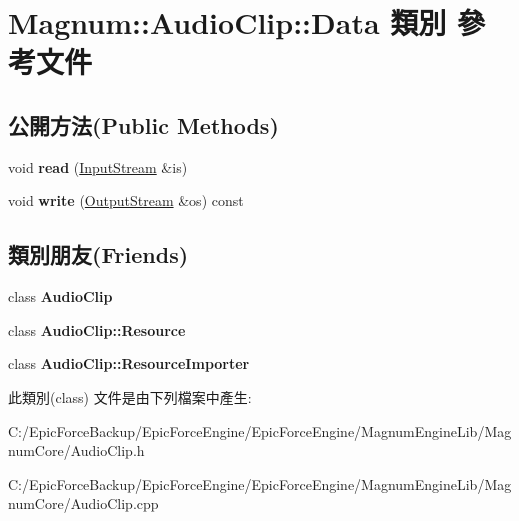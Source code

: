 \hypertarget{class_magnum_1_1_audio_clip_1_1_data}{}\section{Magnum\+:\+:Audio\+Clip\+:\+:Data 類別 參考文件}
\label{class_magnum_1_1_audio_clip_1_1_data}
\subsection*{公開方法(Public Methods)}
\begin{DoxyCompactItemize}
\item 
void {\bfseries read} (\hyperlink{class_magnum_1_1_input_stream}{Input\+Stream} \&is)\hypertarget{class_magnum_1_1_audio_clip_1_1_data_a3550977f63c32b69ca8e9fcb969626fd}{}\label{class_magnum_1_1_audio_clip_1_1_data_a3550977f63c32b69ca8e9fcb969626fd}

\item 
void {\bfseries write} (\hyperlink{class_magnum_1_1_output_stream}{Output\+Stream} \&os) const \hypertarget{class_magnum_1_1_audio_clip_1_1_data_a8439eebdc236289cc3fc9e5635b1609f}{}\label{class_magnum_1_1_audio_clip_1_1_data_a8439eebdc236289cc3fc9e5635b1609f}

\end{DoxyCompactItemize}
\subsection*{類別朋友(Friends)}
\begin{DoxyCompactItemize}
\item 
class {\bfseries Audio\+Clip}\hypertarget{class_magnum_1_1_audio_clip_1_1_data_a9d56e3679258061c40e71e5321153525}{}\label{class_magnum_1_1_audio_clip_1_1_data_a9d56e3679258061c40e71e5321153525}

\item 
class {\bfseries Audio\+Clip\+::\+Resource}\hypertarget{class_magnum_1_1_audio_clip_1_1_data_aad8a33fb5708dac27c0354a31a2e386d}{}\label{class_magnum_1_1_audio_clip_1_1_data_aad8a33fb5708dac27c0354a31a2e386d}

\item 
class {\bfseries Audio\+Clip\+::\+Resource\+Importer}\hypertarget{class_magnum_1_1_audio_clip_1_1_data_a61e6e8f5b764bb025ab23de0a1f690d5}{}\label{class_magnum_1_1_audio_clip_1_1_data_a61e6e8f5b764bb025ab23de0a1f690d5}

\end{DoxyCompactItemize}


此類別(class) 文件是由下列檔案中產生\+:\begin{DoxyCompactItemize}
\item 
C\+:/\+Epic\+Force\+Backup/\+Epic\+Force\+Engine/\+Epic\+Force\+Engine/\+Magnum\+Engine\+Lib/\+Magnum\+Core/Audio\+Clip.\+h\item 
C\+:/\+Epic\+Force\+Backup/\+Epic\+Force\+Engine/\+Epic\+Force\+Engine/\+Magnum\+Engine\+Lib/\+Magnum\+Core/Audio\+Clip.\+cpp\end{DoxyCompactItemize}
